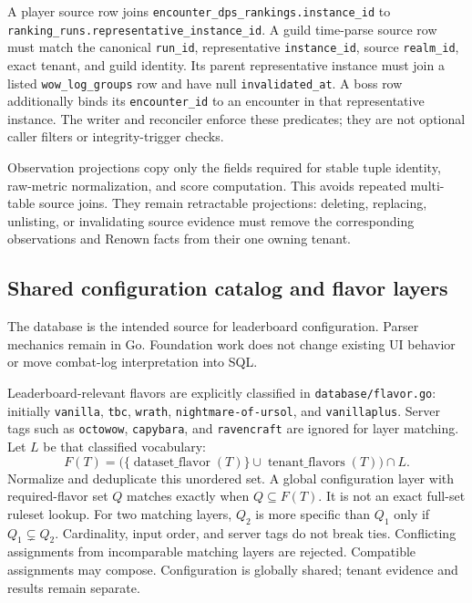\documentclass[11pt]{article}
\newcommand{\field}[1]{\texttt{#1}}
\begin{document}
\begin{sloppypar}
A player source row joins \field{encounter\_\allowbreak dps\_\allowbreak rankings.\allowbreak instance\_\allowbreak id} to \field{ranking\_\allowbreak runs.\allowbreak representative\_\allowbreak instance\_\allowbreak id}. A guild time-parse source row must match the canonical \field{run\_\allowbreak id}, representative \field{instance\_\allowbreak id}, source \field{realm\_\allowbreak id}, exact tenant, and guild identity. Its parent representative instance must join a listed \field{wow\_\allowbreak log\_\allowbreak groups} row and have null \field{invalidated\_\allowbreak at}. A boss row additionally binds its \field{encounter\_\allowbreak id} to an encounter in that representative instance. The writer and reconciler enforce these predicates; they are not optional caller filters or integrity-trigger checks.
\end{sloppypar}

Observation projections copy only the fields required for stable tuple identity, raw-metric normalization, and score computation. This avoids repeated multi-table source joins. They remain retractable projections: deleting, replacing, unlisting, or invalidating source evidence must remove the corresponding observations and Renown facts from their one owning tenant.

\subsection{Shared configuration catalog and flavor layers}
The database is the intended source for leaderboard configuration. Parser mechanics remain in Go. Foundation work does not change existing UI behavior or move combat-log interpretation into SQL.

Leaderboard-relevant flavors are explicitly classified in \field{database/flavor.\allowbreak go}: initially \field{vanilla}, \field{tbc}, \field{wrath}, \field{nightmare-of-ursol}, and \field{vanillaplus}. Server tags such as \field{octowow}, \field{capybara}, and \field{ravencraft} are ignored for layer matching. Let $L$ be that classified vocabulary:
\[
 F(T)=\bigl(\{\operatorname{dataset\_flavor}(T)\}
       \cup\operatorname{tenant\_flavors}(T)\bigr)\cap L.
\]
Normalize and deduplicate this unordered set. A global configuration layer with required-flavor set $Q$ matches exactly when $Q\subseteq F(T)$. It is not an exact full-set ruleset lookup. For two matching layers, $Q_2$ is more specific than $Q_1$ only if $Q_1\subsetneq Q_2$. Cardinality, input order, and server tags do not break ties. Conflicting assignments from incomparable matching layers are rejected. Compatible assignments may compose. Configuration is globally shared; tenant evidence and results remain separate.
\end{document}
